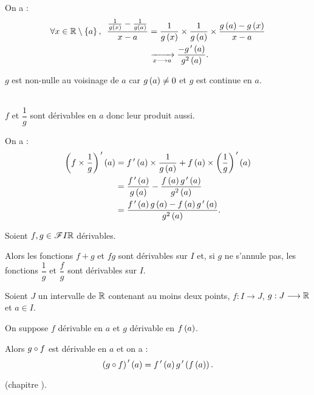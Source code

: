 \begin{dem}[4]
On a : \[\begin{aligned}
\quantifs{\forall x\in\R\excluant\accol{a}}\dfrac{\frac{1}{g\paren{x}}-\frac{1}{g\paren{a}}}{x-a}&=\dfrac{1}{g\paren{x}}\times\dfrac{1}{g\paren{a}}\times\dfrac{g\paren{a}-g\paren{x}}{x-a} \\
&\xrightarrow[x\to a]{}\dfrac{-g\prim\paren{a}}{g^2\paren{a}}.
\end{aligned}\]

\(g\) est non-nulle au voisinage de \(a\) car \(g\left(a\right)\not=0\) et \(g\) est continue en \(a\).
\end{dem}

\begin{dem}[5]~\\
\(f\) et \(\dfrac{1}{g}\) sont dérivables en \(a\) donc leur produit aussi.

On a : \[\begin{aligned}
\left(f\times\dfrac{1}{g}\right)^{\,\prime}\left(a\right)&=f^{\,\prime}\left(a\right)\times\dfrac{1}{g\left(a\right)}+f\left(a\right)\times\left(\dfrac{1}{g}\right)^{\,\prime}\left(a\right) \\
&=\dfrac{f^{\,\prime}\left(a\right)}{g\left(a\right)}-\dfrac{f\left(a\right)g^{\,\prime}\left(a\right)}{g^2\left(a\right)} \\
&=\dfrac{f^{\,\prime}\left(a\right)g\left(a\right)-f\left(a\right)g^{\,\prime}\left(a\right)}{g^2\left(a\right)}.
\end{aligned}\]
\end{dem}

\begin{cor}
Soient \(f,g\in\mathscr{F}{I}{\mathbb{R}}\) dérivables.

Alors les fonctions \(f+g\) et \(fg\) sont dérivables sur \(I\) et, si \(g\) ne s'annule pas, les fonctions \(\dfrac{1}{g}\) et \(\dfrac{f}{g}\) sont dérivables sur \(I\).
\end{cor}

\begin{prop}
Soient \(J\) un intervalle de \(\mathbb{R}\) contenant au moins deux points, \(f:I\to J\), \(g:J\longrightarrow\mathbb{R}\) et \(a\in I\).

On suppose \(f\) dérivable en \(a\) et \(g\) dérivable en \(f\left(a\right)\).

Alors \(g\circ f\) est dérivable en \(a\) et on a : \[\left(g\circ f\right)^{\,\prime}\left(a\right)=f^{\,\prime}\left(a\right)g^{\,\prime}\left(f\left(a\right)\right).\]
\end{prop}

\begin{dem}
 (\cf chapitre ).
\end{dem}

